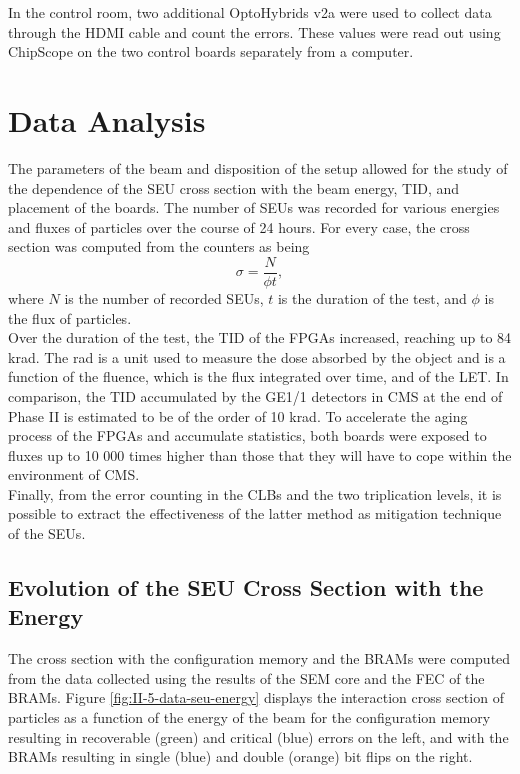     In the control room, two additional OptoHybrids v2a were used to collect data through the HDMI cable and count the errors. These values were read out using ChipScope on the two control boards separately from a computer.

  \section{Data Analysis}

    The parameters of the beam and disposition of the setup allowed for the study of the dependence of the SEU cross section with the beam energy, TID, and placement of the boards. The number of SEUs was recorded for various energies and fluxes of particles over the course of 24 hours. For every case, the cross section was computed from the counters as being
    \begin{equation}
        \sigma = \frac{N}{\phi t} ,
    \end{equation}
    where $ N $ is the number of recorded SEUs, $ t $ is the duration of the test, and $ \phi $ is the flux of particles. \\

    Over the duration of the test, the TID of the FPGAs increased, reaching up to 84 krad. The rad is a unit used to measure the dose absorbed by the object and is a function of the fluence, which is the flux integrated over time, and of the LET. In comparison, the TID accumulated by the GE1/1 detectors in CMS at the end of Phase II is estimated to be of the order of 10 krad. To accelerate the aging process of the FPGAs and accumulate statistics, both boards were exposed to fluxes up to 10 000 times higher than those that they will have to cope within the environment of CMS. \\

    Finally, from the error counting in the CLBs and the two triplication levels, it is possible to extract the effectiveness of the latter method as mitigation technique of the SEUs.

    \subsection{Evolution of the SEU Cross Section with the Energy}

      The cross section with the configuration memory and the BRAMs were computed from the data collected using the results of the SEM core and the FEC of the BRAMs. Figure \ref{fig:II-5-data-seu-energy} displays the interaction cross section of particles as a function of the energy of the beam for the configuration memory resulting in recoverable (green) and critical (blue) errors on the left, and with the BRAMs resulting in single (blue) and double (orange) bit flips on the right. \\

